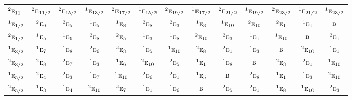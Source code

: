 \documentclass[10pt,a4paper]{article}
\numberwithin{equation}{section}
\newcommand{\irr}[1]{\text{\normalfont\scshape #1}}
\newcommand{\conjpair}[1]{{}^{#1}}
\begin{document}
{\begin{longtable}{@{}lcccccccccccc@{}}
$\conjpair{2}\irr{e}_{11}$ & $\conjpair{2}\irr{e}_{11/2}$ & $\conjpair{2}\irr{e}_{15/2}$ & $\conjpair{1}\irr{e}_{13/2}$ & $\conjpair{2}\irr{e}_{17/2}$ & $\conjpair{1}\irr{e}_{15/2}$ & $\conjpair{2}\irr{e}_{19/2}$ & $\conjpair{1}\irr{e}_{17/2}$ & $\conjpair{2}\irr{e}_{21/2}$ & $\conjpair{1}\irr{e}_{19/2}$ & $\conjpair{2}\irr{e}_{23/2}$ & $\conjpair{1}\irr{e}_{21/2}$ & $\conjpair{1}\irr{e}_{23/2}$\\
$\conjpair{1}\irr{e}_{1/2}$ & $\conjpair{2}\irr{e}_{6}$ & $\conjpair{2}\irr{e}_{5}$ & $\conjpair{1}\irr{e}_{5}$ & $\conjpair{1}\irr{e}_{8}$ & $\conjpair{2}\irr{e}_{8}$ & $\conjpair{2}\irr{e}_{3}$ & $\conjpair{1}\irr{e}_{3}$ & $\conjpair{1}\irr{e}_{10}$ & $\conjpair{2}\irr{e}_{10}$ & $\conjpair{2}\irr{e}_{1}$ & $\conjpair{1}\irr{e}_{1}$ & $\irr{b}$\\
$\conjpair{2}\irr{e}_{1/2}$ & $\conjpair{1}\irr{e}_{5}$ & $\conjpair{1}\irr{e}_{6}$ & $\conjpair{2}\irr{e}_{8}$ & $\conjpair{2}\irr{e}_{5}$ & $\conjpair{1}\irr{e}_{3}$ & $\conjpair{1}\irr{e}_{8}$ & $\conjpair{2}\irr{e}_{10}$ & $\conjpair{2}\irr{e}_{3}$ & $\conjpair{1}\irr{e}_{1}$ & $\conjpair{1}\irr{e}_{10}$ & $\irr{b}$ & $\conjpair{2}\irr{e}_{1}$\\
$\conjpair{1}\irr{e}_{3/2}$ & $\conjpair{1}\irr{e}_{7}$ & $\conjpair{1}\irr{e}_{8}$ & $\conjpair{2}\irr{e}_{6}$ & $\conjpair{2}\irr{e}_{3}$ & $\conjpair{1}\irr{e}_{5}$ & $\conjpair{1}\irr{e}_{10}$ & $\conjpair{2}\irr{e}_{8}$ & $\conjpair{2}\irr{e}_{1}$ & $\conjpair{1}\irr{e}_{3}$ & $\irr{b}$ & $\conjpair{2}\irr{e}_{10}$ & $\conjpair{1}\irr{e}_{1}$\\
$\conjpair{2}\irr{e}_{3/2}$ & $\conjpair{2}\irr{e}_{8}$ & $\conjpair{2}\irr{e}_{7}$ & $\conjpair{1}\irr{e}_{3}$ & $\conjpair{1}\irr{e}_{6}$ & $\conjpair{2}\irr{e}_{10}$ & $\conjpair{2}\irr{e}_{5}$ & $\conjpair{1}\irr{e}_{1}$ & $\conjpair{1}\irr{e}_{8}$ & $\irr{b}$ & $\conjpair{2}\irr{e}_{3}$ & $\conjpair{2}\irr{e}_{1}$ & $\conjpair{1}\irr{e}_{10}$\\
$\conjpair{1}\irr{e}_{5/2}$ & $\conjpair{2}\irr{e}_{4}$ & $\conjpair{2}\irr{e}_{3}$ & $\conjpair{1}\irr{e}_{7}$ & $\conjpair{1}\irr{e}_{10}$ & $\conjpair{2}\irr{e}_{6}$ & $\conjpair{2}\irr{e}_{1}$ & $\conjpair{1}\irr{e}_{5}$ & $\irr{b}$ & $\conjpair{2}\irr{e}_{8}$ & $\conjpair{1}\irr{e}_{1}$ & $\conjpair{1}\irr{e}_{3}$ & $\conjpair{2}\irr{e}_{10}$\\
$\conjpair{2}\irr{e}_{5/2}$ & $\conjpair{1}\irr{e}_{3}$ & $\conjpair{1}\irr{e}_{4}$ & $\conjpair{2}\irr{e}_{10}$ & $\conjpair{2}\irr{e}_{7}$ & $\conjpair{1}\irr{e}_{1}$ & $\conjpair{1}\irr{e}_{6}$ & $\irr{b}$ & $\conjpair{2}\irr{e}_{5}$ & $\conjpair{2}\irr{e}_{1}$ & $\conjpair{1}\irr{e}_{8}$ & $\conjpair{1}\irr{e}_{10}$ & $\conjpair{2}\irr{e}_{3}$\\

\end{longtable}}
\end{document}
